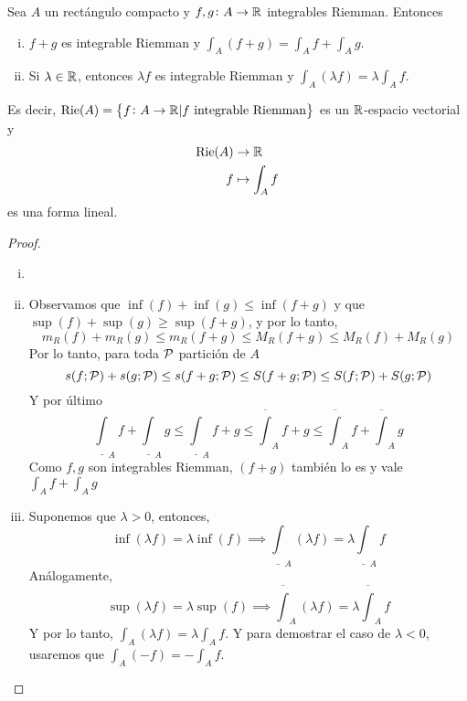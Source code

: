 \begin{prop}[Linealidad]\label{prop:lin_int}
    Sea $A$ un rectángulo compacto y $f,g \colon A \to \mathbb{R}$ integrables Riemman.
    Entonces
    \begin{enumerate}[i)]
        \item $f+g$ es integrable Riemman y $\int_A (f+g) = \int_A f+\int_A g$.
        \item Si $\lambda \in \mathbb{R}$, entonces $\lambda f$ es integrable
            Riemman y $\int_A (\lambda f) = \lambda \int_A f$.
    \end{enumerate}

    Es decir, $\text{Rie}(A) = \left\{f \colon A \to \mathbb{R} \vert f \text{ integrable
    Riemman}\right\}$ es un $\mathbb{R}$-espacio vectorial y
    \[
        \begin{aligned}
            \text{Rie}(A) &\to \mathbb{R} \\ f &\mapsto \int_A f
        \end{aligned}
    \]
    es una forma lineal.
\end{prop}
\begin{proof}
    \begin{enumerate}[i)]
      \item[]
      \item Observamos que $\inf(f) + \inf(g) \leq \inf(f+g)$ y que
            $\sup(f)+\sup(g) \geq \sup(f+g)$, y por lo tanto,
            \[
                m_R(f) + m_R(g) \leq m_R(f+g) \leq M_R(f+g) \leq
                M_R(f) + M_R(g)
            \]
            Por lo tanto, para toda $\mathcal{P}$ partición de $A$
            \[
                s(f;\mathcal{P}) + s(g;\mathcal{P}) \leq s(f+g;\mathcal{P}) \leq S(f+g;\mathcal{P})
                \leq S(f;\mathcal{P}) + S(g;\mathcal{P})
            \]
            Y por último
            \[
                \underline{\int}_A f + \underline{\int}_A g \leq
                \underline{\int}_A f+g \leq \overline{\int}_A f+g \leq
                \overline{\int}_A f + \overline{\int}_A g
            \]
            Como $f,g$ son integrables Riemman, $(f+g)$ también lo es
            y vale $\int_A f + \int_A g$
        \item Suponemos que $\lambda > 0$, entonces,
            \[
                \inf (\lambda f) = \lambda \inf (f) \implies
                \underline{\int}_A (\lambda f) = \lambda
                \underline{\int}_A f
            \]
            Análogamente,
            \[
                \sup(\lambda f) = \lambda \sup(f) \implies
                \overline{\int}_A (\lambda f) = \lambda
                \overline{\int}_A f
            \]
            Y por lo tanto, $\int_A (\lambda f) = \lambda \int_A f$.
            Y para demostrar el caso de $\lambda < 0$, usaremos que
            $\int_A (-f) = - \int_A f$.
    \end{enumerate}
\end{proof}

